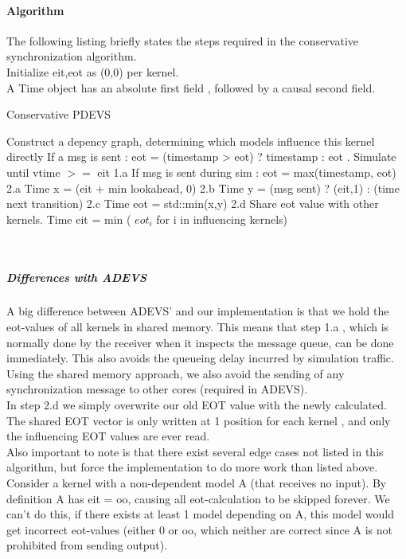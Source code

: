 \documentclass[8pt,a4paper]{report}
\begin{document}
\paragraph{Algorithm}
The following listing briefly states the steps required in the conservative synchronization algorithm.\\
Initialize eit,eot as (0,0) per kernel.\\
A Time object has an absolute first field , followed by a causal second field.\\
\begin{algorithm}
\caption{Conservative PDEVS}
\label{CHalgorithm}
\begin{algorithmic}
 Construct a depency graph, determining which models influence this kernel directly
 If a msg is sent : eot = (timestamp > eot) ? timestamp : eot
. Simulate until vtime $>=$ eit
\State 1.a If msg is sent during sim : eot = max(timestamp, eot)
\State 2.a Time x = (eit + min lookahead, 0)
\State 2.b Time y = (msg sent) ? (eit,1) : (time next transition)
\State 2.c Time eot = std::min(x,y)
\State 2.d Share eot value with other kernels.
   Time eit = min ( $eot_i$ for i in influencing kernels)
\EndWhile
\EndProcedure
\end{algorithmic}
\end{algorithm}\\
\subparagraph{Differences with ADEVS}
A big difference between ADEVS' and our implementation is that we hold the eot-values of all kernels in shared memory. This means that step 1.a , which is normally done by the receiver when it inspects the message queue, can be done immediately. This also avoids the queueing delay incurred by simulation traffic.\\
Using the shared memory approach, we also avoid the sending of any synchronization message to other cores (required in ADEVS). \\In step 2.d we simply overwrite our old EOT value with the newly calculated. The shared EOT vector is only written at 1 position for each kernel , and only the influencing EOT values are ever read. \\
Also important to note is that there exist several edge cases not listed in this algorithm, but force the implementation to do more work than listed above. Consider a kernel with a non-dependent model A (that receives no input). By definition A has eit = oo, causing all eot-calculation to be skipped forever. We can't do this, if there exists at least 1 model depending on A, this model would get incorrect eot-values (either 0 or oo, which neither are correct since A is not prohibited from sending output).\\
\end{document}
